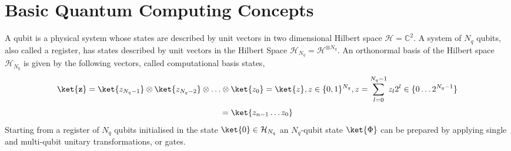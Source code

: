 \documentclass[12pt, oneside]{book}
\theoremstyle{definition}
\theoremstyle{definition}
\theoremstyle{remark}
\begin{document}
\section{Basic Quantum Computing Concepts}
A qubit is a physical system whose states are described by unit vectors in two dimensional Hilbert space $\mathcal{H} = \mathbb{C}^2$. A system of $N_q$ qubits, also called a register, has states described by unit vectors in the Hilbert Space $\mathcal{H}_{N_q}=\mathcal{H}^{\otimes N_q}$. An orthonormal basis of the Hilbert space $\mathcal{H}_{N_q}$ is given by the following vectors, called computational basis states,
\[
\ket{\mathbf{z}}=\ket{z_{N_q-1}}\otimes \ket{z_{N_q-2}} \otimes \ldots \otimes \ket{z_0}=\ket{z}, z\in \{0,1\}^{N_q}, z=\sum_{l=0}^{N_q-1} z_l2^l \in \{0 \ldots 2^{N_q-1}\}
\]
\[=\ket{z_{n-1}\ldots z_0}\]
Starting from a register of $N_q$ qubits initialised in the state $\ket{0} \in \mathcal{H}_{N_q}$ an $N_q$-qubit state $\ket{\Phi}$ can be prepared by applying single and multi-qubit unitary transformations, or gates.
\end{document}
